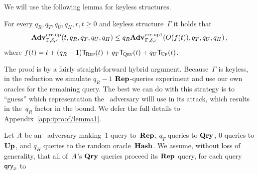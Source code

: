 We will use the following lemma for keyless structures.
%

\begin{lemma}\label{thm:lemma1}
  For every $q_R, q_T, q_U, q_H, r, t \geq 0$ and keyless structure~$\Gamma$ it
  holds that
  \begin{equation*}
    \Adv{\errep}_{\Gamma,\delta,r}(t, q_R, q_T, q_U, q_H) \leq
    q_R\Adv{\errep1}_{\Gamma,\delta,r}(O(f(t)), q_T, q_U, q_H) \,,
  \end{equation*}
  where $f(t) = t + (q_R-1)\ticks(\Rep,t) + q_T\ticks(\Qry,t) + q_U\ticks(\Up,t)$.
\end{lemma}
%
%
\noindent
The proof is by a fairly straight-forward hybrid argument. Because~$\Gamma$ is
keyless, in the reduction we simulate $q_R-1$ $\textup{\textbf{Rep}}\hspace{0.5pt}$-queries experiment and use
our own oracles for the remaining query. The best we can do with this strategy
is to ``guess'' which representation the \errep\ adversary willl use in its
attack, which results in the~$q_R$ factor in the bound.
%
We defer the full details to Appendix~\ref{app:iproof/lemma1}.

Let $\mathit{A}$ be an \errep\ adversary making~$1$ query to~$\textup{\textbf{Rep}}\hspace{0.5pt}$, $q_T$ queries
to $\textup{\textbf{Qry}}\hspace{0.5pt}$, $0$ queries to $\textup{\textbf{Up}}\hspace{0.5pt}$, and $q_H$ queries to the random
oracle~$\textup{\textbf{Hash}}\hspace{0.5pt}$.
%
We assume, without loss of generality, that all of~$\mathit{A}$'s $\textup{\textbf{Qry}}\hspace{0.5pt}$ queries
proceed its $\textup{\textbf{Rep}}\hspace{0.5pt}$ query, for each query $\mathsf{qry}_x$ to  

